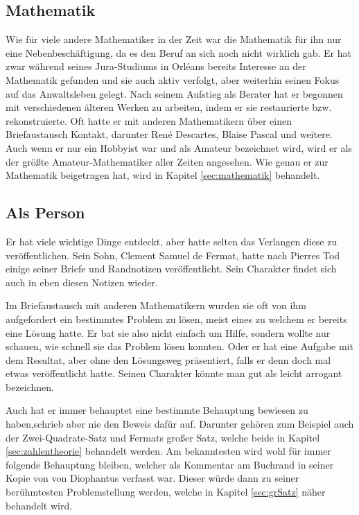 \subsection{Mathematik} \label{sec:biografieMathematik}
Wie für viele andere Mathematiker in der Zeit war die Mathematik für ihn nur eine Nebenbeschäftigung, da es den Beruf  an sich noch nicht wirklich gab. Er hat zwar während seines Jura-Studiums in Orléans bereits Interesse an der Mathematik gefunden und sie auch aktiv verfolgt, aber weiterhin seinen Fokus auf das Anwaltsleben gelegt. Nach seinem Aufstieg als Berater hat er begonnen mit verschiedenen älteren Werken zu arbeiten, indem er sie restaurierte bzw. rekonstruierte. Oft hatte er mit anderen Mathematikern über einen Briefaustausch Kontakt, darunter René Descartes, Blaise Pascal und weitere. Auch wenn er nur ein Hobbyist war und als Amateur bezeichnet wird, wird er als der größte Amateur-Mathematiker aller Zeiten angesehen. \cite{mlodinow2011wenn, britannicaFermat} Wie genau er zur Mathematik beigetragen hat, wird in Kapitel \ref{sec:mathematik} behandelt.

\subsection{Als Person}\label{sec:person}
Er hat viele wichtige Dinge entdeckt, aber hatte selten das Verlangen diese zu veröffentlichen. Sein Sohn, Clement Samuel de Fermat, hatte nach Pierres Tod einige seiner Briefe und Randnotizen veröffentlicht. Sein Charakter findet sich auch in eben diesen Notizen wieder.

Im Briefaustausch mit anderen Mathematikern wurden sie oft von ihm aufgefordert ein bestimmtes Problem zu lösen, meist eines zu welchem er bereits eine Lösung hatte. Er bat sie also nicht einfach um Hilfe, sondern wollte nur schauen, wie schnell sie das Problem lösen konnten. Oder er hat eine Aufgabe mit dem Resultat, aber ohne den Lösungsweg präsentiert, falls er denn doch mal etwas veröffentlicht hatte. Seinen Charakter könnte man gut als leicht arrogant bezeichnen.

Auch hat er immer behauptet eine bestimmte Behauptung bewiesen zu haben,schrieb aber nie den Beweis dafür auf. Darunter gehören zum Beispiel auch der Zwei-Quadrate-Satz und Fermats großer Satz, welche beide in Kapitel \ref{sec:zahlentheorie} behandelt werden. Am bekanntesten wird wohl für immer folgende Behauptung bleiben, welcher als Kommentar am Buchrand in seiner Kopie von \textit{} von Diophantus verfasst war. Dieser würde dann zu seiner berühmtesten Problemstellung werden, welche in Kapitel \ref{sec:grSatz} näher behandelt wird.

\begin{quote}
\end{quote}
